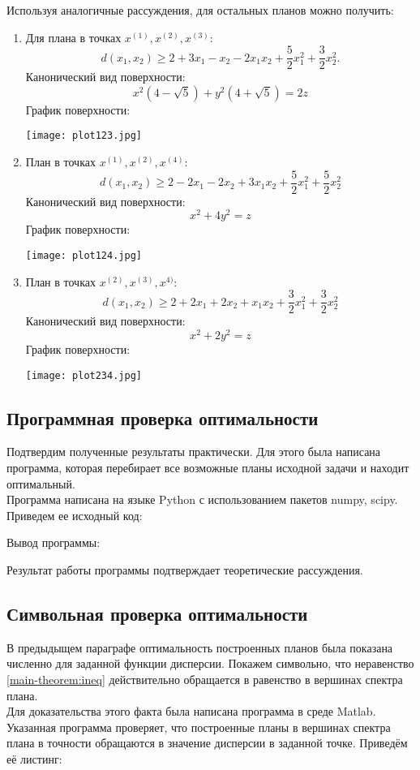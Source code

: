 	Используя аналогичные рассуждения, для остальных планов можно получить:
	\begin{enumerate}
		\item Для плана в точках $x^{(1)}, x^{(2)}, x^{(3)}$:
			$$d(x_1, x_2) \ge 2 + 3x_1 - x_2 -2x_1x_2 +\frac{5}{2}x_1^2 + \frac 3 2 x_2^2.$$
			Канонический вид поверхности:
						$$x^2 (4 - \sqrt{5}) + y^2 (4 + \sqrt 5) = 2z$$
			График поверхности:\\
					\begin{center}\texttt{[image: plot123.jpg]}\end{center}
			
		\item План в точках $x^{(1)}, x^{(2)}, x^{(4)}$:
			$$d(x_1, x_2) \ge 2 - 2x_1 - 2x_2 +3x_1x_2 +\frac{5}{2}x_1^2 + \frac 5 2 x_2^2$$
				Канонический вид поверхности:
						$$x^2 + 4y^2 = z$$
			График поверхности:\\
					\begin{center}\texttt{[image: plot124.jpg]}\end{center}
		\item План в точках $x^{(2)}, x^{(3)}, x^{4)}$:
			$$d(x_1, x_2) \ge 2 + 2x_1 + 2x_2 +x_1x_2 +\frac{3}{2}x_1^2 + \frac 3 2 x_2^2$$
			Канонический вид поверхности:
						$$x^2 + 2 y^2 = z$$
			График поверхности:\\
					\begin{center}\texttt{[image: plot234.jpg]}\end{center}
	\end{enumerate}
	
\subsection{Программная проверка оптимальности}
	Подтвердим полученные результаты практически. Для этого была написана программа, которая перебирает все возможные планы исходной задачи и находит оптимальный.\\
	Программа написана на языке Python с использованием пакетов numpy, scipy.\\
	Приведем ее исходный код:
	

	Вывод программы:
	
	Результат работы программы подтверждает теоретические рассуждения.

	
\subsection {Символьная проверка оптимальности}
	 В предыдыщем параграфе оптимальность построенных планов была показана численно для заданной функции дисперсии. Покажем символьно, что неравенство \eqref{main-theorem:ineq} действительно обращается в равенство в вершинах спектра плана.\\
	Для доказательства этого факта была написана программа в среде Matlab.
	Указанная программа проверяет, что построенные планы в вершинах спектра плана в точности обращаются в значение дисперсии в заданной точке.
	Приведём её листинг:
	
	
